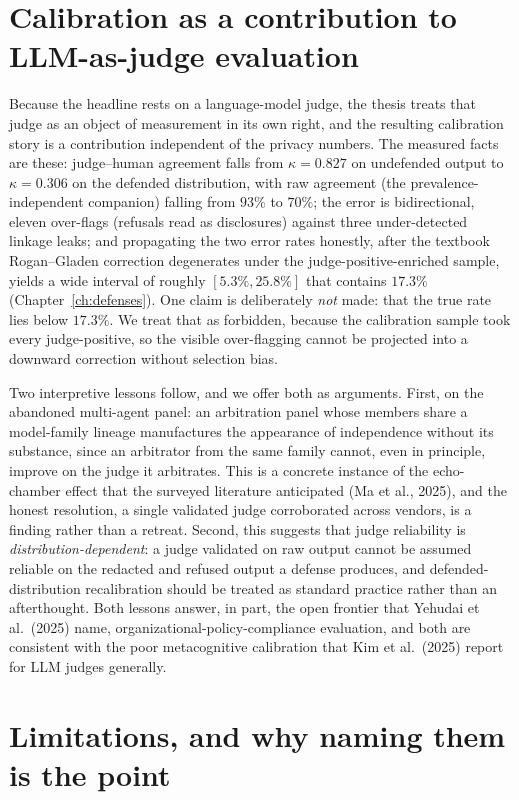 \section{Calibration as a contribution to LLM-as-judge evaluation}
\label{sec:disc-judge}

Because the headline rests on a language-model judge, the thesis treats that judge as an object
of measurement in its own right, and the resulting calibration story is a contribution
independent of the privacy numbers. The measured facts are these: judge--human agreement falls
from $\kappa = 0.827$ on undefended output to $\kappa = 0.306$ on the defended distribution,
with raw agreement (the prevalence-independent companion) falling from $93\%$ to $70\%$; the
error is bidirectional, eleven over-flags (refusals read as disclosures) against three
under-detected linkage leaks; and propagating the two error rates honestly, after the textbook
Rogan--Gladen correction degenerates under the judge-positive-enriched sample, yields a wide
interval of roughly $[5.3\%, 25.8\%]$ that contains $17.3\%$ (Chapter~\ref{ch:defenses}). One
claim is deliberately \emph{not} made: that the true rate lies below $17.3\%$. We treat that as
forbidden, because the calibration sample took every judge-positive, so the visible over-flagging
cannot be projected into a downward correction without selection bias.

Two interpretive lessons follow, and we offer both as arguments. First, on the abandoned
multi-agent panel: an arbitration panel whose members share a model-family lineage
manufactures the appearance of independence without its substance, since an arbitrator from the
same family cannot, even in principle, improve on the judge it arbitrates. This is a concrete
instance of the echo-chamber effect that the surveyed literature anticipated
(Ma et al., 2025), and the honest resolution, a single validated judge corroborated across
vendors, is a finding rather than a retreat. Second, this suggests that judge
reliability is \emph{distribution-dependent}: a judge validated on raw output cannot be assumed
reliable on the redacted and refused output a defense produces, and
defended-distribution recalibration should be treated as standard practice rather than an
afterthought. Both lessons answer, in part, the open frontier that Yehudai et al.\ (2025)
name, organizational-policy-compliance evaluation, and both are consistent with the poor
metacognitive calibration that Kim et al.\ (2025) report for LLM judges generally.

\section{Limitations, and why naming them is the point}
\label{sec:disc-limits}


